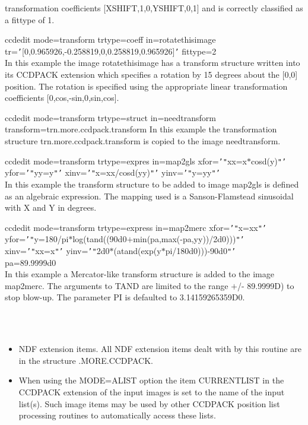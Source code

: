 \documentclass[twoside,11pt]{article}
\renewcommand{\_}{\texttt{\symbol{95}}}
\newcommand{\qt}[1]{{\tt "}#1{\tt "}}
\newcommand{\qs}[1]{{\tt '}#1{\tt '}}
\newcommand{\sstexamplesubsection}[2]{\sloppy \item{\ssttt #1} \mbox{} \\ #2 }
\newcommand{\sstnotes}[1]{\item[Notes:] \mbox{} \\[1.3ex] #1}
\newcommand{\sstitemlist}[1]{
  \mbox{} \\
  \vspace{-3.5ex}
  \begin{itemize}
     #1
  \end{itemize}
}
\newcommand{\sstitem}{\item}
\newcommand{\sstexamplesubsection}[2]{\item[{\ssttt #1}] #2}
\newcommand{\sstnotes}[1]{\item[Notes:] #1 }
\newcommand{\sstitemlist}[1]{
      \begin{itemize}
         #1
      \end{itemize}
      \\
   }
\newcommand{\sstitem}{\item}
\begin{document}
{{{         transformation coefficients [XSHIFT,1,0,YSHIFT,0,1] and is
         correctly classified as a fittype of 1.
      }
      \sstexamplesubsection{
         ccdedit mode=transform trtype=coeff in=rotate\_this\_image
              tr=\qs{[0,0.965926,-0.258819,0,0.258819,0.965926]} fittype=2
      }{
         In this example the image rotate\_this\_image has a transform
         structure written into its CCDPACK extension which specifies a
         rotation by 15 degrees about the [0,0] position. The rotation
         is specified using the appropriate linear transformation
         coefficients [0,cos,-sin,0,sin,cos].
      }
      \sstexamplesubsection{
         ccdedit mode=transform trtype=struct in=need\_transform
      }{
              transform=trn.more.ccdpack.transform
         In this example the transformation structure
         trn.more.ccdpack.transform is copied to the image need\_transform.
      }
      \sstexamplesubsection{
         ccdedit mode=transform trtype=expres in=map2gls
              xfor=\qs{\qt{xx=x$*$cosd(y)}} yfor=\qs{\qt{yy=y}}
              xinv=\qs{\qt{x=xx/cosd(yy)}}
              yinv=\qs{\qt{y=yy}}
      }{
         In this example the transform structure to be added to image
         map2gls is defined as an algebraic expression. The mapping used
         is a Sanson-Flamstead sinusoidal with X and Y in degrees.
      }
      \sstexamplesubsection{
         ccdedit mode=transform trtype=express in=map2merc
              xfor=\qs{\qt{x=xx}}
yfor=\qs{\qt{y=180/pi$*$log(tand((90d0$+$min(pa,max(-pa,yy))/2d0)))}}
              xinv=\qs{\qt{xx=x}}
yinv=\qs{\qt{2d0$*$(atand(exp(y$*$pi/180d0)))-90d0}} \\
              pa=89.9999d0
      }{
         In this example a Mercator-like transform structure is added to
         the image map2merc. The arguments to TAND are limited to the
         range $+$/- 89.9999D) to stop blow-up. The parameter PI is
         defaulted to 3.14159265359D0.
      }
   }
   \sstnotes{
      \sstitemlist{

         \sstitem
         NDF extension items.
            All NDF extension items dealt with by this routine are in the
            structure .MORE.CCDPACK.

         \sstitem
         When using the MODE=ALIST option the item CURRENT\_LIST in the
           CCDPACK extension of the input images is set to the name of the
           input list(s). Such image items may be used by other CCDPACK
           position list processing routines to automatically access
           these lists.

}}}
\end{document}
